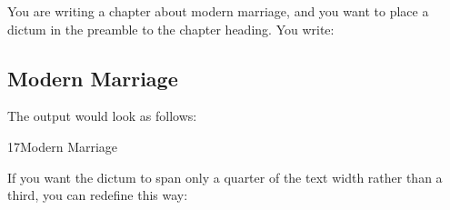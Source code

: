  \begin{Example}
   You are writing a chapter about modern marriage, and you want to place a
   dictum in the preamble to the chapter heading. You write:
\begin{lstcode}
  \chapter{Modern Marriage}
\end{lstcode}
  The output would look as follows:
  \begin{ShowOutput}
    {%
      17\enskip Modern Marriage\par} \vspace{\baselineskip}
  \end{ShowOutput}
	
  If you want the dictum to span only a quarter of the text width
  rather than a third, you can redefine  this way:
\begin{lstcode}
  \renewcommand*{\dictumwidth}{.25\textwidth}
\end{lstcode}
\end{Example}

%
\fi
%
\EndIndexGroup
%
\EndIndexGroup

